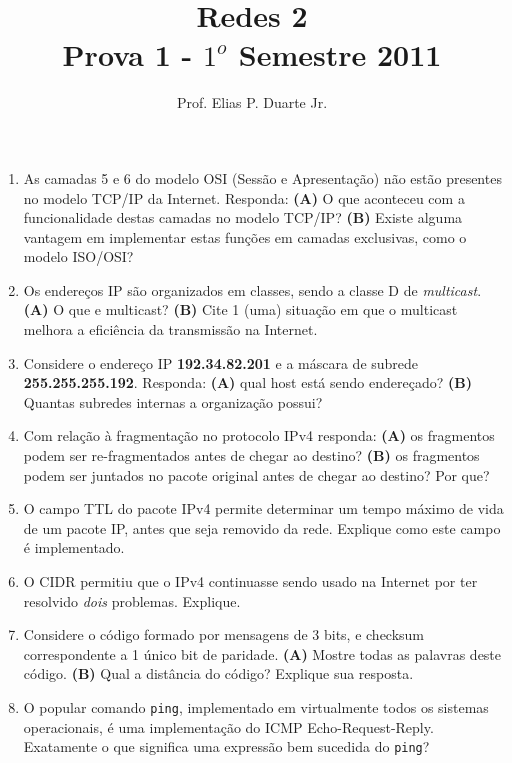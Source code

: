 \documentclass[a4paper,11pt]{article}
\date{ }
\begin{document}
\title{
Redes 2\\
Prova 1 - $1^o$ Semestre 2011
}

\author {
Prof. Elias P. Duarte Jr.
}

\maketitle

\begin{enumerate}

\item As camadas 5 e 6 do modelo OSI (Sessão e Apresentação) não estão presentes
no modelo TCP/IP da Internet. Responda: \textbf{(A)} O que aconteceu com a
funcionalidade destas camadas no modelo TCP/IP? \textbf{(B)} Existe alguma
vantagem em implementar estas funções em camadas exclusivas, como o modelo
ISO/OSI?

\item Os endereços IP são organizados em classes, sendo a classe D de
\textit{multicast}. \textbf{(A)} O que e multicast? \textbf{(B)} Cite 1 (uma)
situação em que o multicast melhora a eficiência da transmissão na Internet.

\item Considere o endereço IP \textbf{192.34.82.201} e a máscara de subrede
\textbf{255.255.255.192}. Responda: \textbf{(A)} qual host está sendo
endereçado?  \textbf{(B)} Quantas subredes internas a organização possui?

\item Com relação à fragmentação no protocolo IPv4 responda: \textbf{(A)} os
fragmentos podem ser re-fragmentados antes de chegar ao destino? \textbf{(B)} os
fragmentos podem ser juntados no pacote original antes de chegar ao destino? Por
que?

\item O campo TTL do pacote IPv4 permite determinar um tempo máximo de vida de
um pacote IP, antes que seja removido da rede. Explique como este campo é
implementado.

\item O CIDR permitiu que o IPv4 continuasse sendo usado na Internet por ter
resolvido \textit{dois} problemas. Explique.

\item Considere o código formado por mensagens de 3 bits, e checksum
correspondente a 1 único bit de paridade. \textbf{(A)} Mostre todas as
palavras deste código. \textbf{(B)} Qual a distância do código? Explique sua
resposta.

\item O popular comando \texttt{ping}, implementado em virtualmente todos os
sistemas operacionais, é uma implementação do ICMP Echo-Request-Reply.
Exatamente o que significa uma expressão bem sucedida do \texttt{ping}?

\end{enumerate}
\end{document}
